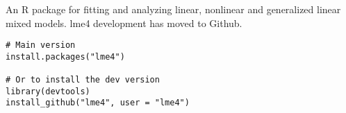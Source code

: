 
An R package for fitting and analyzing linear, nonlinear and generalized linear mixed models. 
lme4 development has moved to Github.

\begin{verbatim}
# Main version
install.packages("lme4")

# Or to install the dev version
library(devtools)
install_github("lme4", user = "lme4")
\end{verbatim}

